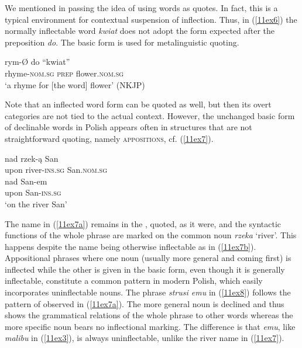 \documentclass[output=paper,colorlinks,citecolor=brown]{langscibook}
\begin{document}
We mentioned in passing the idea of using words as quotes. In fact, this is a typical environment for contextual suspension of inflection. Thus, in (\ref{11ex6}) the normally inflectable word \emph{kwiat} does not adopt the form expected after the preposition \emph{do}. The basic form is used for metalinguistic quoting.

\begin{exe}
	\ex \label{11ex6}
	\gll rym-Ø do ``kwiat'' \\
	rhyme-\textsc{nom.sg} \textsc{prep} flower.\textsc{nom.sg} \\
	\trans ‘a rhyme for [the word] flower’ \hfill (NKJP)
\end{exe}

Note that an inflected word form can be quoted as well, but then its overt categories are not tied to the actual context. However, the unchanged basic form of declinable words in Polish appears often in structures that are not straightforward quoting, namely \textsc{appositions}, cf. (\ref{11ex7}).

\begin{exe}
	\ex \label{11ex7}
	\begin{xlist}
		\ex \label{11ex7a}
		\gll nad rzek-ą San \\
		upon river-\textsc{ins.sg} San.\textsc{nom.sg} \\
		
		\ex \label{11ex7b}
		\gll nad San-em \\
		upon San-\textsc{ins.sg} \\
		\trans ‘on the river San’
	\end{xlist}
\end{exe}

The name in (\ref{11ex7a}) remains in the , quoted, as it were, and the syntactic functions of the whole phrase are marked on the common noun \emph{rzeka} `river'. This happens despite the name being otherwise inflectable as in (\ref{11ex7b}). Appositional phrases where one noun (usually more general and coming first) is inflected while the other is given in the basic form, even though it is generally inflectable, constitute a common pattern in modern Polish, which easily incorporates uninflectable nouns. The phrase \emph{strusi emu} in (\ref{11ex8}) follows the pattern of  observed in (\ref{11ex7a}). The more general noun is declined and thus shows the grammatical relations of the whole phrase to other words whereas the more specific noun bears no inflectional marking. The difference is that \emph{emu}, like \emph{malibu} in (\ref{11ex3}), is always uninflectable, unlike the river name in (\ref{11ex7}).
\end{document}
